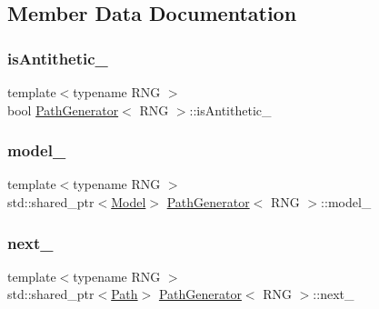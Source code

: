 \subsection{Member Data Documentation}
\hypertarget{class_path_generator_aa45100f04c27cd0f25c059c410316346}{}\label{class_path_generator_aa45100f04c27cd0f25c059c410316346} 
\subsubsection{\texorpdfstring{is\+Antithetic\+\_\+}{isAntithetic\_}}
{\footnotesize\ttfamily template$<$typename R\+NG $>$ \\
bool \hyperlink{class_path_generator}{Path\+Generator}$<$ R\+NG $>$\+::is\+Antithetic\+\_\+\hspace{0.3cm}{\ttfamily [private]}}

\hypertarget{class_path_generator_a80dcaacd0b79c84c4bf83e980f5ed7ff}{}\label{class_path_generator_a80dcaacd0b79c84c4bf83e980f5ed7ff} 
\subsubsection{\texorpdfstring{model\+\_\+}{model\_}}
{\footnotesize\ttfamily template$<$typename R\+NG $>$ \\
std\+::shared\+\_\+ptr$<$\hyperlink{class_model}{Model}$>$ \hyperlink{class_path_generator}{Path\+Generator}$<$ R\+NG $>$\+::model\+\_\+\hspace{0.3cm}{\ttfamily [private]}}

\hypertarget{class_path_generator_a2af5b3cab0498565a56b20e97a3d6f35}{}\label{class_path_generator_a2af5b3cab0498565a56b20e97a3d6f35} 
\subsubsection{\texorpdfstring{next\+\_\+}{next\_}}
{\footnotesize\ttfamily template$<$typename R\+NG $>$ \\
std\+::shared\+\_\+ptr$<$\hyperlink{class_path}{Path}$>$ \hyperlink{class_path_generator}{Path\+Generator}$<$ R\+NG $>$\+::next\+\_\+\hspace{0.3cm}{\ttfamily [private]}}

